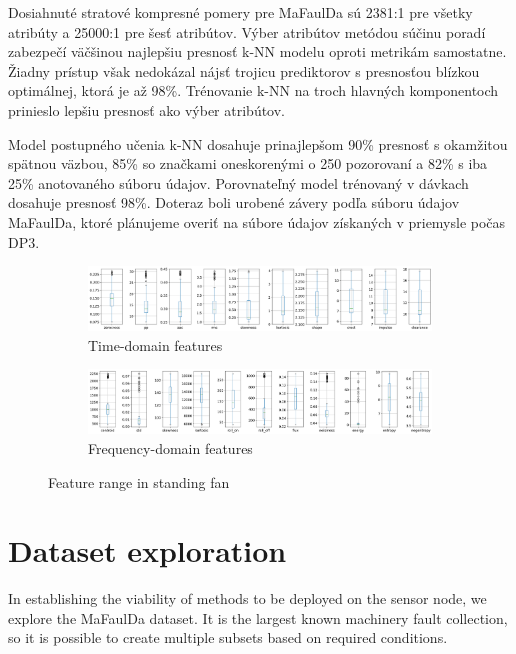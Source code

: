 Dosiahnuté stratové kompresné pomery pre MaFaulDa sú 2381:1 pre všetky atribúty a 25000:1 pre šesť atribútov. Výber atribútov metódou súčinu poradí zabezpečí väčšinou najlepšiu presnosť k-NN modelu oproti metrikám samostatne. Žiadny prístup však nedokázal nájsť trojicu prediktorov s presnosťou blízkou optimálnej, ktorá je až 98\%. Trénovanie k-NN na troch hlavných komponentoch prinieslo lepšiu presnosť ako výber atribútov. 

Model postupného učenia k-NN dosahuje prinajlepšom 90\% presnosť s okamžitou spätnou väzbou, 85\% so značkami oneskorenými o 250 pozorovaní a 82\% s iba 25\% anotovaného súboru údajov. Porovnateľný model trénovaný v dávkach dosahuje presnosť 98\%.  Doteraz boli urobené závery podľa súboru údajov MaFaulDa, ktoré plánujeme overiť na súbore údajov získaných v priemysle počas DP3.

\begin{figure}[h]
    \centering
    \begin{subfigure}[b]{0.48\textwidth}
        \includegraphics[width=\textwidth]{assets/results/feature-values/fan-TD-features.png}
        \caption{Time-domain features}
    \end{subfigure}
    \hfill
    \begin{subfigure}[b]{0.48\textwidth}
        \includegraphics[width=\textwidth]{assets/results/feature-values/fan-FD-features.png}
        \caption{Frequency-domain features}
    \end{subfigure}
    \caption{Feature range in standing fan}
\end{figure}




\section{Dataset exploration}
In establishing the viability of methods to be deployed on the sensor node, we explore the MaFaulDa dataset. It is the largest known machinery fault collection, so it is possible to create multiple subsets based on required conditions. 


